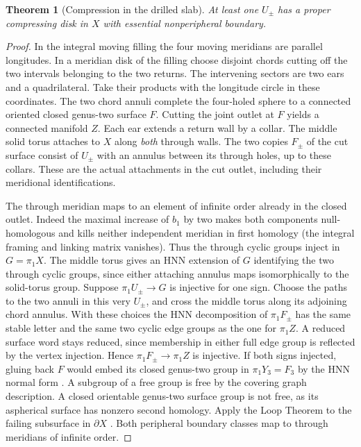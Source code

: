 \documentclass[11pt,letterpaper]{article}
\numberwithin{equation}{section}
\newtheorem{theorem}{Theorem}[section]
\theoremstyle{remark}
\begin{document}
\begin{theorem}[Compression in the drilled slab]\label{thm:mixed-four}
At least one \(U_\pm\) has a proper compressing disk in \(X\) with
essential nonperipheral boundary.
\end{theorem}
\begin{proof}
In the integral moving filling the four moving meridians are
parallel longitudes. In a meridian disk of the filling choose
disjoint chords cutting off the two intervals belonging to the two
returns. The intervening sectors are two ears and a quadrilateral.
Take their products with the longitude circle in these coordinates.
The two chord annuli complete the four-holed sphere to a connected
oriented closed genus-two surface \(F\). Cutting the joint outlet
at \(F\) yields a connected manifold \(Z\). Each ear extends a return
wall by a collar. The middle solid torus attaches to \(X\) along
\emph{both} through walls. The two copies \(F_\pm\) of the cut
surface consist of \(U_\pm\) with an annulus between its through holes,
up to these collars. These are the actual attachments in the cut
outlet, including their meridional identifications.

The through meridian maps to an element of infinite order already
in the closed outlet. Indeed the maximal increase of \(b_1\) by two
makes both components null-homologous and kills neither independent
meridian in first homology (the integral framing and linking matrix
vanishes). Thus the through cyclic groups inject in \(G=\pi_1X\).
The middle torus gives an HNN extension of \(G\) identifying the two
through cyclic groups, since either attaching annulus maps
isomorphically to the solid-torus group. Suppose
\(\pi_1 U_\pm\to G\) is injective for one sign. Choose the paths to
the two annuli in this very \(U_\pm\), and cross the middle torus along
its adjoining chord annulus. With these choices the HNN decomposition
of \(\pi_1 F_\pm\) has the same stable letter and the same two cyclic
edge groups as the one for \(\pi_1Z\). A reduced surface word stays
reduced, since membership in either full edge group is reflected by
the vertex injection. Hence \(\pi_1 F_\pm\to\pi_1 Z\) is injective.
If both signs injected, gluing back \(F\) would embed its closed
genus-two group in \(\pi_1Y_3=F_3\) by the HNN normal form
\cite{HigmanNeumannNeumann1949,Britton1963Word}. A subgroup of a free group is
free by the covering graph description. A closed orientable
genus-two surface group is not free, as its aspherical surface has
nonzero second homology. Apply the Loop Theorem to the failing
subsurface in \(\partial X\) \cite{Stallings1960Loop}. Both peripheral
boundary classes map to through meridians of infinite order.
\end{proof}
\end{document}
